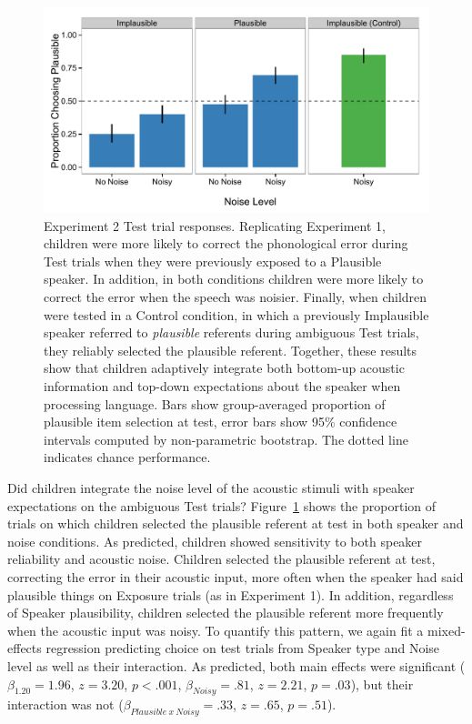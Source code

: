 \documentclass[man,floatsintext]{apa6}
\begin{document}
\begin{figure}[t]
     \centering
     \includegraphics[width=5in]{figures/exp2_results.pdf}
    \caption{Experiment 2 Test trial responses. Replicating Experiment 1, children were more likely to correct the phonological error during Test trials when they were previously exposed to a Plausible speaker. In addition, in both conditions children were more likely to correct the error when the speech was noisier. Finally, when children were tested in a Control condition, in which a previously Implausible speaker referred to \emph{plausible} referents during ambiguous Test trials, they reliably selected the plausible referent. Together, these results show that children adaptively integrate both bottom-up acoustic information and top-down expectations about the speaker when processing language. Bars show group-averaged proportion of plausible item selection at test, error bars show 95\% confidence intervals computed by non-parametric bootstrap. The dotted line indicates chance performance.}%
   \label{fig:exp2_results}
\end{figure}

Did children integrate the noise level of the acoustic stimuli with speaker expectations on the ambiguous Test trials? Figure~\ref{fig:exp2_results} shows the proportion of trials on which children selected the plausible referent at test in both speaker and noise conditions. As predicted, children showed sensitivity to both speaker reliability and acoustic noise. Children selected the plausible referent at test, correcting the error in their acoustic input, more often when the speaker had said plausible things on Exposure trials (as in Experiment 1). In addition, regardless of Speaker plausibility, children selected the plausible referent more frequently when the acoustic input was noisy. To quantify this pattern, we again fit a mixed-effects regression predicting choice on test trials from Speaker type and Noise level as well as their interaction. As predicted, both main effects were significant ($\beta_{1.20} = 1.96$,  $z = 3.20$, $p <.001$, $\beta_{Noisy} = .81$,  $z = 2.21$, $p = .03$), but their interaction was not ($\beta_{Plausible \: x \: Noisy} = .33$,  $z = .65$, $p = .51$).
\end{document}
